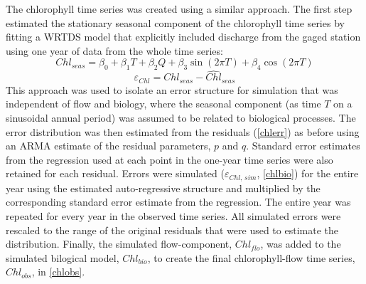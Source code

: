\documentclass[letterpaper,12pt,oneside]{article}\usepackage[]{graphicx}\usepackage[]{color}
\begin{document}
The chlorophyll time series was created using a similar approach.  The first step estimated the stationary seasonal component of the chlorophyll time series by fitting a \ac{WRTDS} model \citep{Hirsch10} that explicitly included discharge from the gaged station using one year of data from the whole time series:
\begin{equation}\label{chlseas}
Chl_{seas} = \beta_0 + \beta_1 T + \beta_2 Q + \beta_3 \sin\left(2\pi T\right) + \beta_4 \cos\left(2\pi T\right)
\end{equation}
\begin{equation} \label{chlerr}
\varepsilon_{Chl} = Chl_{seas} - \widehat{Chl}_{seas}
\end{equation}
This approach was used to isolate an error structure for simulation that was independent of flow and biology, where the seasonal component (as time $T$ on a sinusoidal annual period) was assumed to be related to biological processes.  The error distribution was then estimated from the residuals (\cref{chlerr}) as before using an \ac{ARMA} estimate of the residual parameters, $p$ and $q$.  Standard error estimates from the regression used at each point in the one-year time series were also retained for each residual.  Errors were simulated ($\varepsilon_{Chl,\,sim}$, \cref{chlbio}) for the entire year using the estimated auto-regressive structure and multiplied by the corresponding standard error estimate from the regression.  The entire year was repeated for every year in the observed time series.  All simulated errors were rescaled to the range of the original residuals that were used to estimate the distribution.  Finally, the simulated flow-component, $Chl_{flo}$, was added to the simulated bilogical model, $Chl_{bio}$, to create the final chlorophyll-flow time series, $Chl_{obs}$, in \cref{chlobs}.  
\end{document}
